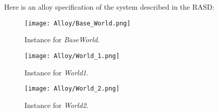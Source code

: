 Here is an alloy specification of the system described in the RASD:

\newpage

\begin{figure}[H]
    \begin{center}
        \texttt{[image: Alloy/Base\_World.png]}
        \caption{Instance for \textit{BaseWorld}.}
        \label{fig:BaseWorld}%
    \end{center}
\end{figure}

\begin{figure}[H]
    \begin{center}
        \texttt{[image: Alloy/World\_1.png]}
        \caption{Instance for \textit{World1}.}
        \label{fig:World1}%
    \end{center}
\end{figure}


\begin{figure}[H]
    \begin{center}
        \texttt{[image: Alloy/World\_2.png]}
        \caption{Instance for \textit{World2}.}
        \label{fig:World2}%
    \end{center}
\end{figure}